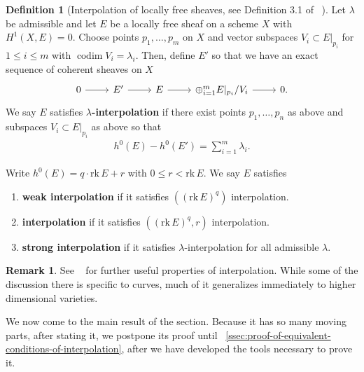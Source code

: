 \documentclass[reqno, 11pt]{amsart}
\theoremstyle{definition}
\theoremstyle{remark}
\numberwithin{equation}{section}
\numberwithin{thm}{section}
\numberwithin{prop}{section}
\numberwithin{lem}{section}
\numberwithin{cor}{section}
\numberwithin{conj}{section}
\numberwithin{defn}{section}
\newcommand{\rk}{{\text{rk}\,}}
\theoremstyle{plain}
\theoremstyle{definition}
\newtheorem{definition}[theorem]{Definition}
\newtheorem{remark}[theorem]{Remark}
\DeclareMathOperator\codim{codim}
\begin{document}
\begin{definition}[Interpolation of locally free sheaves, see Definition 3.1 of ~\cite{atanasov:interpolation-and-vector-bundles-on-curves}]
	\label{definition:vector-bundle-interpolation}
	Let $\lambda$ be admissible and let $E$ be a locally free sheaf on a scheme $X$
	with $H^1(X, E) = 0$.
	Choose points $p_1, \ldots, p_m$ on $X$ and
	vector subspaces $V_i \subset E|_{p_i}$ for $1 \leq i \leq m$
	with $\codim V_i = \lambda_i$.
	Then, define $E'$ so that we have an exact sequence of coherent sheaves on $X$
	\begin{equation}
		\label{equation:sequence-cohomological-interpolation-definition}
		\begin{tikzcd}
		  0 \ar{r} & E' \ar{r} & E \ar{r} & \oplus_{i=1}^m E|_{p_i}/V_i \ar{r} & 0.
		\end{tikzcd}\end{equation}
	We say $E$ satisfies {\bf $\lambda$-interpolation}
	if there exist points $p_1, \ldots, p_n$ as above
	and subspaces $V_i \subset E|_{p_i}$ as above
	so that
	\begin{align*}
		h^0(E) - h^0(E') = \sum_{i=1}^m \lambda_i.
	\end{align*}

	Write $h^0(E) = q \cdot \rk E + r$ with $0 \leq r < \rk E$.
	We say $E$ satisfies
	\begin{enumerate}
		\item {\bf weak interpolation} if it satisfies
			$\left( (\rk E)^q \right)$
			interpolation.
		\item {\bf interpolation} if it satisfies
			$\left( (\rk E)^q, r \right)$ interpolation.
		\item {\bf strong interpolation} if it satisfies
			$\lambda$-interpolation for all
			admissible $\lambda$.
	\end{enumerate}
\end{definition}
\begin{remark}
	\label{remark:}
	See ~\cite[Section 4]{atanasovLY:interpolation-for-normal-bundles-of-general-curves} for further useful properties of interpolation.
	While some of the discussion there is specific
	to curves, much of it generalizes immediately to higher
	dimensional varieties. 
\end{remark}

We now come to the main result of the section. 
Because it has so many moving parts, after stating
it, we postpone its proof until
~\autoref{ssec:proof-of-equivalent-conditions-of-interpolation},
after we have developed the tools necessary to prove it.
\end{document}
